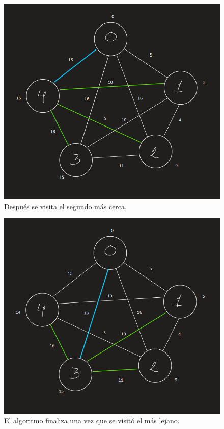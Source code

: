 \documentclass[11pt]{article}
\begin{document}
\begin{figure}[!htbp]
\centering
\includegraphics[scale = .5]{grafos3}
\caption{Después se visita el segundo más cerca.}
\end{figure}

\begin{figure}[!htbp]
\centering
\includegraphics[scale = .5]{grafos5}
\caption{El algoritmo finaliza una vez que se visitó el más lejano.}
\end{figure}
\end{document}
